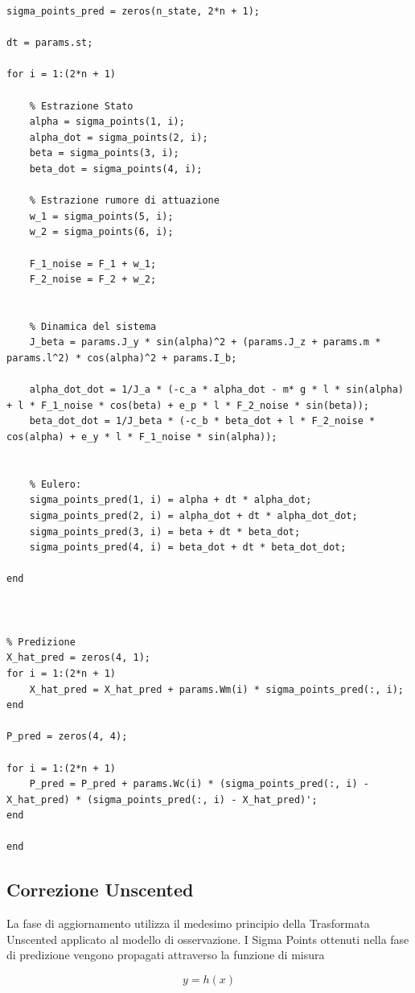 \documentclass[12pt,a4paper]{article}
\begin{document}
\begin{lstlisting}[style=matlabstyle, caption={Blocco di predizione dell'UKF}, label={lst:predizione_ukf}]
sigma_points_pred = zeros(n_state, 2*n + 1);

dt = params.st;

for i = 1:(2*n + 1)

    % Estrazione Stato
    alpha = sigma_points(1, i);
    alpha_dot = sigma_points(2, i);
    beta = sigma_points(3, i);
    beta_dot = sigma_points(4, i);

    % Estrazione rumore di attuazione
    w_1 = sigma_points(5, i);
    w_2 = sigma_points(6, i);

    F_1_noise = F_1 + w_1;
    F_2_noise = F_2 + w_2;


    % Dinamica del sistema
    J_beta = params.J_y * sin(alpha)^2 + (params.J_z + params.m * params.l^2) * cos(alpha)^2 + params.I_b;

    alpha_dot_dot = 1/J_a * (-c_a * alpha_dot - m* g * l * sin(alpha) + l * F_1_noise * cos(beta) + e_p * l * F_2_noise * sin(beta));
    beta_dot_dot = 1/J_beta * (-c_b * beta_dot + l * F_2_noise * cos(alpha) + e_y * l * F_1_noise * sin(alpha));
    

    % Eulero:
    sigma_points_pred(1, i) = alpha + dt * alpha_dot;
    sigma_points_pred(2, i) = alpha_dot + dt * alpha_dot_dot;
    sigma_points_pred(3, i) = beta + dt * beta_dot;
    sigma_points_pred(4, i) = beta_dot + dt * beta_dot_dot;

end



% Predizione
X_hat_pred = zeros(4, 1);
for i = 1:(2*n + 1)
    X_hat_pred = X_hat_pred + params.Wm(i) * sigma_points_pred(:, i);
end

P_pred = zeros(4, 4);

for i = 1:(2*n + 1)
    P_pred = P_pred + params.Wc(i) * (sigma_points_pred(:, i) - X_hat_pred) * (sigma_points_pred(:, i) - X_hat_pred)';
end

end
\end{lstlisting}


\subsection{Correzione Unscented}
La fase di aggiornamento utilizza il medesimo principio della Trasformata Unscented applicato al modello di osservazione.
I Sigma Points ottenuti nella fase di predizione vengono propagati attraverso la funzione di misura

\begin{equation}
y = h(x)
\end{equation}
\end{document}
